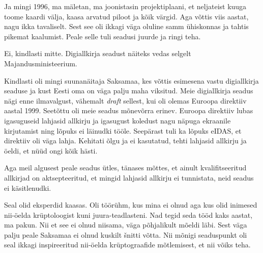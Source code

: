 Ja mingi 1996, ma mäletan, ma joonistasin projektiplaani, et neljateist kuuga 
toome kaardi välja, kaasa arvatud piloot ja kõik värgid. Aga võttis viis 
aastat, nagu ikka tavaliselt. Sest see oli ikkagi väga oluline samm ühiskonnas 
ja tahtis pikemat kaalumist. Peale selle tuli seadusi juurde ja ringi teha. 


Ei, kindlasti mitte. Digiallkirja seadust näiteks vedas selgelt 
Majandusministeerium.


Kindlasti oli mingi suunanäitaja Saksamaa, kes võttis esimesena vastu 
digiallkirja seaduse ja kust Eesti oma on väga palju maha viksitud. Meie 
digiallkirja seadus nägi enne ilmavalgust, vähemalt \emph{draft} sellest, kui 
oli olemas Euroopa direktiiv aastal 1999. Seetõttu oli meie seadus mõnevõrra erinev. Euroopa 
direktiiv  lubas igasuguseid lahjasid allkirju ja igasugust koledust nagu  
näpuga ekraanile kirjutamist ning lõpuks ei läinudki tööle. Seepärast  tuli ka 
lõpuks eIDAS, et direktiiv 
oli väga lahja. Kehitati õlgu ja ei kasutatud, tehti lahjasid allkirju ja 
öeldi, et nüüd ongi kõik hästi. 

Aga meil  algusest peale seadus ütles, tänases mõttes, et ainult 
kvalifitseeritud allkirjad on aktsepteeritud, et mingid lahjasid allkirju  ei 
tunnistata, neid seadus ei käsitlenudki. 


Seal olid eksperdid kaasas. Oli töörühm, kus mina ei olnud aga kus olid 
inimesed nii-öelda krüptoloogist kuni juura-teadlasteni. Nad tegid seda tööd 
kaks aastat, ma pakun. Nii et see ei olnud niisama, väga põhjalikult mõeldi 
läbi. Sest  väga palju peale Saksamaa ei olnud kuskilt šnitti võtta. Nii mõnigi 
seaduspunkt oli seal ikkagi inspireeritud nii-öelda krüptograafide mõtlemisest, 
et nii võiks teha. 

